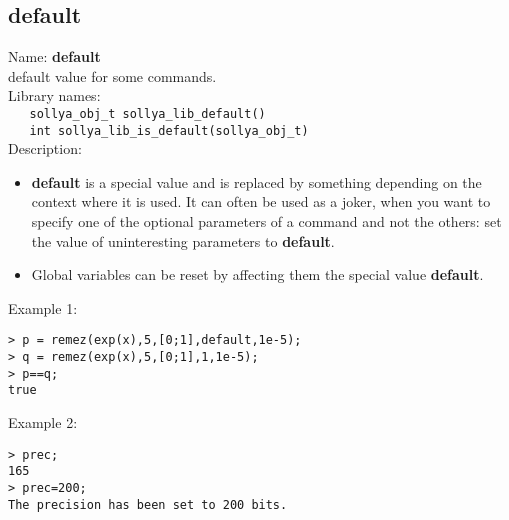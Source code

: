 \subsection{default}
\label{labdefault}
\noindent Name: \textbf{default}\\
\phantom{aaa}default value for some commands.\\[0.2cm]
\noindent Library names:\\
\verb|   sollya_obj_t sollya_lib_default()|\\
\verb|   int sollya_lib_is_default(sollya_obj_t)|\\[0.2cm]
\noindent Description: \begin{itemize}

\item \textbf{default} is a special value and is replaced by something depending on the 
   context where it is used. It can often be used as a joker, when you want to 
   specify one of the optional parameters of a command and not the others: set 
   the value of uninteresting parameters to \textbf{default}.

\item Global variables can be reset by affecting them the special value \textbf{default}.
\end{itemize}
\noindent Example 1: 
\begin{center}\begin{minipage}{15cm}\begin{Verbatim}[frame=single,commandchars=\\\|\~]
> p = remez(exp(x),5,[0;1],default,1e-5);
> q = remez(exp(x),5,[0;1],1,1e-5);
> p==q;
true
\end{Verbatim}
\end{minipage}\end{center}
\noindent Example 2: 
\begin{center}\begin{minipage}{15cm}\begin{Verbatim}[frame=single,commandchars=\\\|\~]
> prec;
165
> prec=200;
The precision has been set to 200 bits.
\end{Verbatim}
\end{minipage}\end{center}
